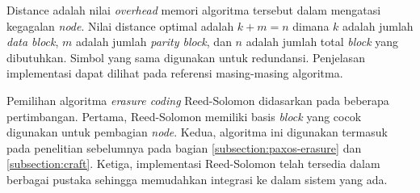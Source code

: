 Distance adalah nilai \textit{overhead} memori algoritma tersebut dalam mengatasi kegagalan \textit{node}. Nilai distance optimal adalah $k + m = n$ dimana $k$ adalah jumlah \textit{data block}, $m$ adalah jumlah \textit{parity block}, dan $n$ adalah jumlah total \textit{block} yang dibutuhkan. Simbol yang sama digunakan untuk redundansi. Penjelasan implementasi dapat dilihat pada referensi masing-masing algoritma.

Pemilihan algoritma \textit{erasure coding} Reed-Solomon didasarkan pada beberapa pertimbangan. Pertama, Reed-Solomon memiliki basis \textit{block} yang cocok digunakan untuk pembagian \textit{node}. Kedua, algoritma ini digunakan termasuk pada penelitian sebelumnya pada bagian \ref{subsection:paxos-erasure} dan \ref{subsection:craft}. Ketiga, implementasi Reed-Solomon telah tersedia dalam berbagai pustaka sehingga memudahkan integrasi ke dalam sistem yang ada.